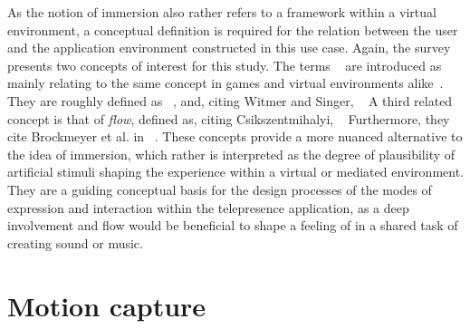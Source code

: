 As the notion of immersion also rather refers to a framework within a virtual environment, a conceptual definition is required for the relation between the user and the application environment constructed in this use case.
Again, the survey presents two concepts of interest for this study.
The terms ~\parencite[8]{surveyOfPresence} are introduced as mainly relating to the same concept in games and virtual environments alike~\parencite[8]{surveyOfPresence}.
They are roughly defined as ~\parencite[8]{surveyOfPresence}, and, citing Witmer and Singer, ~\parencite[8]{surveyOfPresence}
A third related concept is that of \emph{flow}, defined as, citing Csikszentmihalyi, ~\parencite[9]{surveyOfPresence}
Furthermore, they cite Brockmeyer et al.
in ~\parencite[9]{surveyOfPresence}.
These concepts provide a more nuanced alternative to the idea of immersion, which rather is interpreted as the degree of plausibility of artificial stimuli shaping the experience within a virtual or mediated environment.
They are a guiding conceptual basis for the design processes of the modes of expression and interaction within the telepresence application, as a deep involvement and flow would be beneficial to shape a feeling of  in a shared task of creating sound or music.

\section{Motion capture}
\label{sec:motion-capture}

